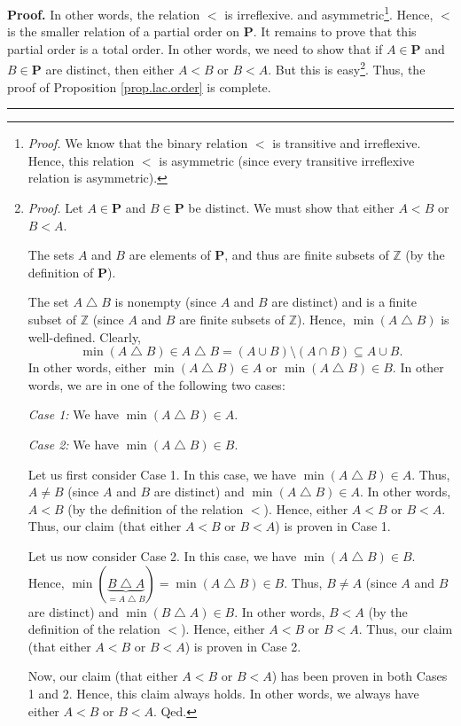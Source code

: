 \documentclass[numbers=enddot,12pt,final,onecolumn,notitlepage]{scrartcl}%
\theoremstyle{definition}
\newenvironment{proof}[1][Proof]{\noindent\textbf{#1.} }{\ \rule{0.5em}{0.5em}}
\newenvironment{verlong}{}{}
\begin{document}
\begin{verlong}
\begin{proof}
{In other words, the relation $<$ is irreflexive.} and
asymmetric\footnote{\textit{Proof.} We know that the binary relation $<$ is
transitive and irreflexive. Hence, this relation $<$ is asymmetric (since
every transitive irreflexive relation is asymmetric).}. Hence, $<$ is the
smaller relation of a partial order on $\mathbf{P}$. It remains to prove that
this partial order is a total order. In other words, we need to show that if
$A\in\mathbf{P}$ and $B\in\mathbf{P}$ are distinct, then either $A<B$ or
$B<A$. But this is easy\footnote{\textit{Proof.} Let $A\in\mathbf{P}$ and
$B\in\mathbf{P}$ be distinct. We must show that either $A<B$ or $B<A$.
\par
The sets $A$ and $B$ are elements of $\mathbf{P}$, and thus are finite subsets
of $\mathbb{Z}$ (by the definition of $\mathbf{P}$).
\par
The set $A\bigtriangleup B$ is nonempty (since $A$ and $B$ are distinct) and
is a finite subset of $\mathbb{Z}$ (since $A$ and $B$ are finite subsets of
$\mathbb{Z}$). Hence, $\min\left(  A\bigtriangleup B\right)  $ is
well-defined. Clearly,%
\[
\min\left(  A\bigtriangleup B\right)  \in A\bigtriangleup B=\left(  A\cup
B\right)  \setminus\left(  A\cap B\right)  \subseteq A\cup B.
\]
In other words, either $\min\left(  A\bigtriangleup B\right)  \in A$ or
$\min\left(  A\bigtriangleup B\right)  \in B$. In other words, we are in one
of the following two cases:
\par
\textit{Case 1:} We have $\min\left(  A\bigtriangleup B\right)  \in A$.
\par
\textit{Case 2:} We have $\min\left(  A\bigtriangleup B\right)  \in B$.
\par
Let us first consider Case 1. In this case, we have $\min\left(
A\bigtriangleup B\right)  \in A$. Thus, $A\neq B$ (since $A$ and $B$ are
distinct) and $\min\left(  A\bigtriangleup B\right)  \in A$. In other words,
$A<B$ (by the definition of the relation $<$). Hence, either $A<B$ or $B<A$.
Thus, our claim (that either $A<B$ or $B<A$) is proven in Case 1.
\par
Let us now consider Case 2. In this case, we have $\min\left(
A\bigtriangleup B\right)  \in B$. Hence, $\min\left(
\underbrace{B\bigtriangleup A}_{=A\bigtriangleup B}\right)  =\min\left(
A\bigtriangleup B\right)  \in B$. Thus, $B\neq A$ (since $A$ and $B$ are
distinct) and $\min\left(  B\bigtriangleup A\right)  \in B$. In other words,
$B<A$ (by the definition of the relation $<$). Hence, either $A<B$ or $B<A$.
Thus, our claim (that either $A<B$ or $B<A$) is proven in Case 2.
\par
Now, our claim (that either $A<B$ or $B<A$) has been proven in both Cases 1
and 2. Hence, this claim always holds. In other words, we always have either
$A<B$ or $B<A$. Qed.}. Thus, the proof of Proposition \ref{prop.lac.order} is complete.
\end{proof}
\end{verlong}
\end{document}
